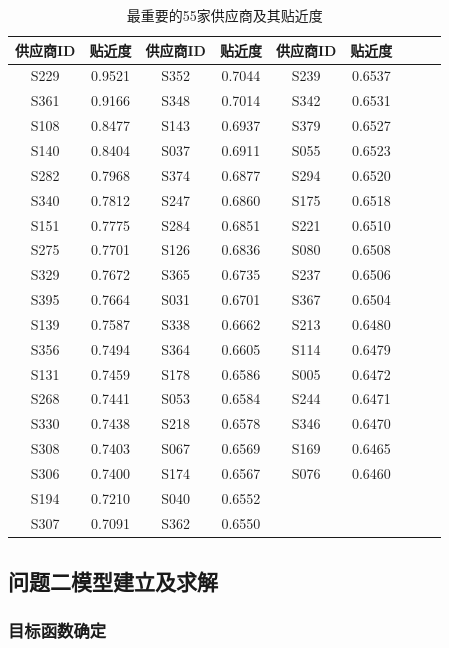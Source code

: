 \documentclass[12pt,a4paper]{ctexart}
\theoremstyle{definition}
\theoremstyle{plain}
\theoremstyle{remark}
\begin{document}
\begin{table}[H]
\centering
\caption{最重要的55家供应商及其贴近度}
\label{tab:top55}
\begin{tabular}{ccccccccc}
\toprule
供应商ID & 贴近度 & 供应商ID & 贴近度 & 供应商ID & 贴近度 \\
\midrule
S229 & 0.9521 & S352 & 0.7044 & S239 & 0.6537 \\
S361 & 0.9166 & S348 & 0.7014 & S342 & 0.6531 \\
S108 & 0.8477 & S143 & 0.6937 & S379 & 0.6527 \\
S140 & 0.8404 & S037 & 0.6911 & S055 & 0.6523 \\
S282 & 0.7968 & S374 & 0.6877 & S294 & 0.6520 \\
S340 & 0.7812 & S247 & 0.6860 & S175 & 0.6518 \\
S151 & 0.7775 & S284 & 0.6851 & S221 & 0.6510 \\
S275 & 0.7701 & S126 & 0.6836 & S080 & 0.6508 \\
S329 & 0.7672 & S365 & 0.6735 & S237 & 0.6506 \\
S395 & 0.7664 & S031 & 0.6701 & S367 & 0.6504 \\
S139 & 0.7587 & S338 & 0.6662 & S213 & 0.6480 \\
S356 & 0.7494 & S364 & 0.6605 & S114 & 0.6479 \\
S131 & 0.7459 & S178 & 0.6586 & S005 & 0.6472 \\
S268 & 0.7441 & S053 & 0.6584 & S244 & 0.6471 \\
S330 & 0.7438 & S218 & 0.6578 & S346 & 0.6470 \\
S308 & 0.7403 & S067 & 0.6569 & S169 & 0.6465 \\
S306 & 0.7400 & S174 & 0.6567 & S076 & 0.6460 \\
S194 & 0.7210 & S040 & 0.6552 &  &  &  \\
S307 & 0.7091 & S362 & 0.6550 &  &  &  \\
\bottomrule
\end{tabular}
\end{table}

\subsection{问题二模型建立及求解}

\subsubsection{目标函数确定}
\end{document}
